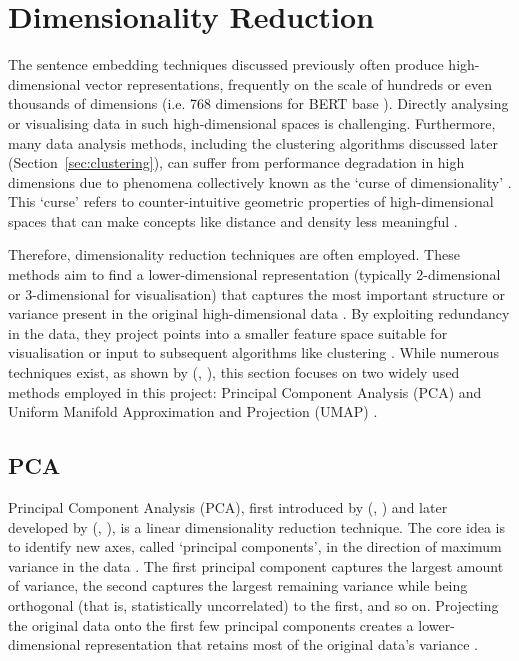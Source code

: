 \documentclass[10pt,oneside]{report}
\renewcommand{\citet}[1]{\citeauthor{#1}, \citeyear{#1}}
\begin{document}
\section{Dimensionality Reduction}\label{sec:dimred}

The sentence embedding techniques discussed previously often produce high-dimensional vector representations, frequently on the scale of hundreds or even thousands of dimensions (i.e. 768 dimensions for BERT base \cite{devlin2019bert}). Directly analysing or visualising data in such high-dimensional spaces is challenging. Furthermore, many data analysis methods, including the clustering algorithms discussed later (Section~\ref{sec:clustering}), can suffer from performance degradation in high dimensions due to phenomena collectively known as the `curse of dimensionality' \cite{verleysen2005curse, hinneburg1999optimal}. This `curse' refers to counter-intuitive geometric properties of high-dimensional spaces that can make concepts like distance and density less meaningful \cite{verleysen2005curse}.

Therefore, dimensionality reduction techniques are often employed. These methods aim to find a lower-dimensional representation (typically 2-dimensional or 3-dimensional for visualisation) that captures the most important structure or variance present in the original high-dimensional data \cite{sorzano2014survey}. By exploiting redundancy in the data, they project points into a smaller feature space suitable for visualisation or input to subsequent algorithms like clustering \cite{sorzano2014survey, hinneburg1999optimal}. While numerous techniques exist, as shown by (\citet{sorzano2014survey}), this section focuses on two widely used methods employed in this project: Principal Component Analysis (PCA) \cite{pearson1901liii, hotelling1933analysis} and Uniform Manifold Approximation and Projection (UMAP) \cite{mcinnes2018umap}.

\subsection{PCA}\label{sec:pca}

Principal Component Analysis (PCA), first introduced by (\citet{pearson1901liii}) and later developed by (\citet{hotelling1933analysis}), is a linear dimensionality reduction technique. The core idea is to identify new axes, called `principal components', in the direction of maximum variance in the data \cite{abdi2010principal}. The first principal component captures the largest amount of variance, the second captures the largest remaining variance while being orthogonal (that is, statistically uncorrelated) to the first, and so on. Projecting the original data onto the first few principal components creates a lower-dimensional representation that retains most of the original data's variance \cite{abdi2010principal}.
\end{document}
